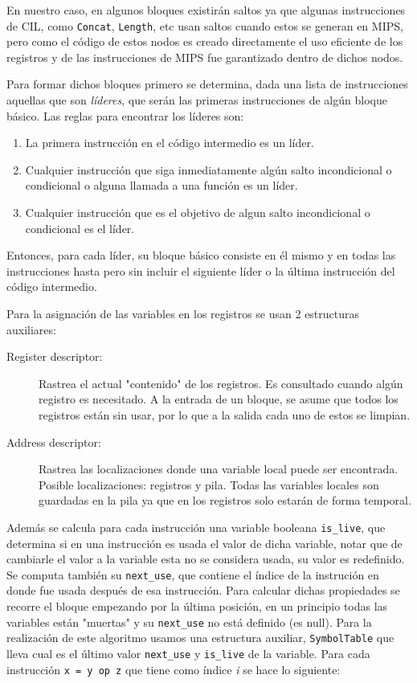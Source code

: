 \documentclass[11pt]{scrartcl} %
\begin{document}
En nuestro caso, en algunos bloques existirán saltos ya que algunas instrucciones de CIL, como \texttt{Concat}, \texttt{Length}, etc usan saltos cuando estos se generan en MIPS, pero como el código de estos nodos es creado directamente el uso eficiente de los registros y de las instrucciones de MIPS fue garantizado dentro de dichos nodos.

Para formar dichos bloques primero se determina, dada una lista de instrucciones aquellas que son \textit{líderes}, que serán las primeras instrucciones de algún bloque básico. Las reglas para encontrar los líderes son:

\begin{enumerate}
	\item La primera instrucción en el código intermedio es un líder.
	\item Cualquier instrucción que siga inmediatamente algún salto incondicional o condicional o alguna llamada a una función es un líder.
	\item Cualquier instrucción que es el objetivo de algun salto incondicional o condicional es el líder.
\end{enumerate}

Entonces, para cada líder, su bloque básico consiste en él mismo y en todas las instrucciones hasta pero sin incluir el siguiente líder o la última instrucción del código intermedio.


Para la asignación de las variables en los registros se usan 2 estructuras auxiliares:
\begin{description}
	\item[Register descriptor:] Rastrea el actual "contenido" de los registros. Es consultado cuando algún registro es necesitado. A la entrada de un bloque, se asume que todos los registros están sin usar, por lo que a la salida cada uno de estos se limpian.
	\item[Address descriptor:] Rastrea las localizaciones donde una variable local puede ser encontrada. Posible localizaciones: registros y pila. Todas las variables locales son guardadas en la pila ya que en los registros solo estarán de forma temporal.
\end{description}

Además se calcula para cada instrucción una variable booleana \texttt{is\_live}, que determina si en una instrucción es usada el valor de dicha variable, notar que de cambiarle el valor a la variable esta no se considera usada, su valor es redefinido. Se computa también su \texttt{next\_use}, que contiene el índice de la instrución en donde fue usada después de esa instrucción. Para calcular dichas propiedades se recorre el bloque empezando por la última posición, en un principio todas las variables están "muertas" y su \texttt{next\_use} no está definido (es null). Para la realización de este algoritmo usamos una estructura auxiliar, \texttt{SymbolTable} que lleva cual es el último valor \texttt{next\_use} y \texttt{is\_live} de la variable. Para cada instrucción \texttt{x = y op z} que tiene como índice \textit{i} se hace lo siguiente:
\end{document}
